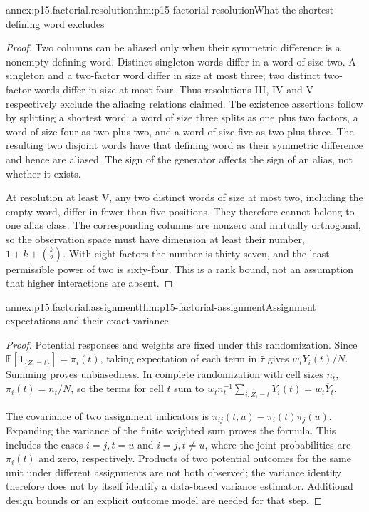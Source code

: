 \begin{annexitem}{annex:p15.factorial.resolution}{thm:p15-factorial-resolution}{What the shortest defining word excludes}
\begin{proof}
Two columns can be aliased only when their symmetric difference is a
nonempty defining word. Distinct singleton words differ in a word of size
two. A singleton and a two-factor word differ in size at most three;
two distinct two-factor words differ in size at most four. Thus resolutions
III, IV and V respectively exclude the aliasing relations claimed.
The existence assertions follow by splitting a shortest word: a word
of size three splits as one plus two factors, a word of size four as
two plus two, and a word of size five as two plus three. The resulting
two disjoint words have that defining word as their symmetric difference
and hence are aliased. The sign of the generator affects the sign of an
alias, not whether it exists.

At resolution at least V, any two distinct words of size at most two,
including the empty word, differ in fewer than five positions. They
therefore cannot belong to one alias class. The corresponding columns
are nonzero and mutually orthogonal, so the observation space must have
dimension at least their number, \(1+k+\binom{k}{2}\). With eight
factors the number is thirty-seven, and the least permissible power of
two is sixty-four. This is a rank bound, not an assumption that higher
interactions are absent.
\end{proof}
\end{annexitem}

\begin{annexitem}{annex:p15.factorial.assignment}{thm:p15-factorial-assignment}{Assignment expectations and their exact variance}
\begin{proof}
Potential responses and weights are fixed under this randomization.
Since \(\mathbb E[\mathbf1_{\{Z_i=t\}}]=\pi_i(t)\), taking expectation
of each term in \(\widehat\tau\) gives \(w_tY_i(t)/N\). Summing
proves unbiasedness. In complete randomization with cell sizes \(n_t\),
\(\pi_i(t)=n_t/N\), so the terms for cell \(t\) sum to
\(w_t n_t^{-1}\sum_{i:Z_i=t}Y_i(t)=w_t\overline Y_t\).

The covariance of two assignment indicators is
\(\pi_{ij}(t,u)-\pi_i(t)\pi_j(u)\). Expanding the variance of the
finite weighted sum proves the formula. This includes the cases
\(i=j,t=u\) and \(i=j,t\ne u\), where the joint probabilities are
\(\pi_i(t)\) and zero, respectively. Products of two potential outcomes
for the same unit under different assignments are not both observed;
the variance identity therefore does not by itself identify a data-based
variance estimator. Additional design bounds or an explicit outcome model
are needed for that step.
\end{proof}
\end{annexitem}

